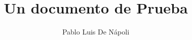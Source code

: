\documentclass {article}
\begin{document}
 
\title{Un documento de Prueba} 
\author{Pablo Luis De Nápoli} 
\maketitle 
\end{document}
